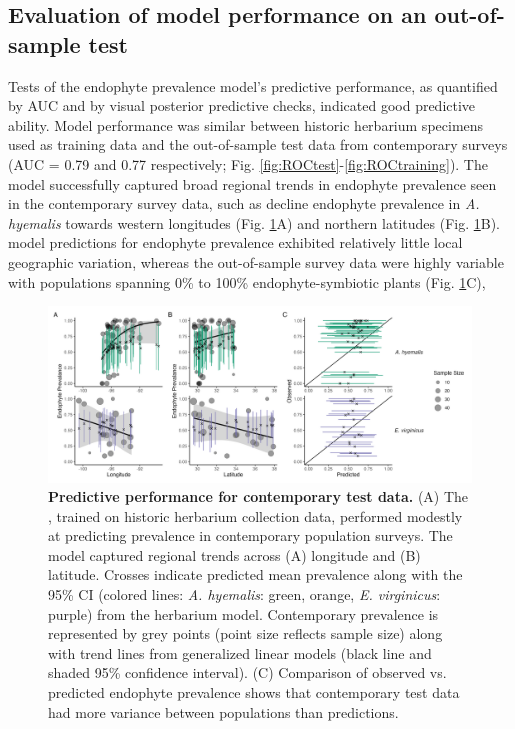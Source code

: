 \documentclass[11pt]{article}
\newcommand{\firstrevise}[1]{{\color{black}{#1}}}
\begin{document}
\subsection*{Evaluation of model performance on an out-of-sample test}
Tests of the endophyte prevalence model's predictive performance, as quantified by AUC and by visual posterior predictive checks, indicated good predictive ability. 
Model performance was similar between historic herbarium specimens used as training data and the out-of-sample test data from contemporary surveys (AUC = 0.79 and 0.77 respectively; Fig. \ref{fig:ROCtest}-\ref{fig:ROCtraining}).  
The model successfully captured broad regional trends in endophyte prevalence seen in the contemporary survey data, such as decline endophyte prevalence in \emph{A. hyemalis} towards western longitudes (Fig. \ref{fig:contemptestplot}A) and \firstrevise{an increase towards} northern latitudes (Fig. \ref{fig:contemptestplot}B). 
\firstrevise{It is noteable that} model predictions for endophyte prevalence exhibited relatively little local geographic variation, whereas the out-of-sample survey data were highly variable with populations spanning 0\% to 100\% endophyte-symbiotic plants (Fig. \ref{fig:contemptestplot}C), \firstrevise{indicating population-to-population variation not captured in the endophyte prevalence model.}



\begin{figure}[H]
	\centering
	\includegraphics[width = \linewidth]{../Plots/contemp_test_plot.png}
	\caption[Predictive performance for contemporary test data.]{\textbf{Predictive performance for contemporary test data.} (A)
		 The \firstrevise{endophyte prevalence model}, trained on historic herbarium collection data, performed modestly at predicting prevalence in contemporary population surveys. The model captured regional trends across (A) longitude and (B) latitude. Crosses indicate predicted mean prevalence along with the 95\% CI (colored lines: \emph{A. hyemalis}: green, orange, \emph{E. virginicus}: purple) from the herbarium model. Contemporary prevalence is represented by grey points (point size reflects sample size) along with trend lines from generalized linear models (black line and shaded 95\% confidence interval). (C) Comparison of \firstrevise{contemporary} observed \firstrevise{population prevalence} vs. predicted endophyte prevalence shows that contemporary test data had more variance between populations than \firstrevise{in model} predictions.}
	\label{fig:contemptestplot}
\end{figure}
\end{document}
